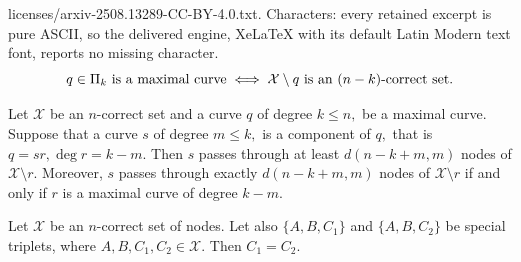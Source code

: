 \documentclass[10pt,a4paper]{amsart}
\newcommand{\Xset}{\mathcal{X}}
\begin{document}
licenses/arxiv-2508.13289-CC-BY-4.0.txt. Characters: every retained excerpt is pure ASCII, so the delivered engine, XeLaTeX with its default Latin Modern text font, reports no missing character.
\begin{equation}\label{maxmax}q\in\Pi_k \hbox{ is a maximal curve}  \iff \Xset\setminus q  \hbox{ is an $(n-k)$-correct set.}\end{equation} 

\begin{proposition}\label{maxcomp} Let $\Xset$ be an $n$-correct set  and
a curve $q$ of degree $k\le n,$ be a maximal curve. Suppose that a curve $s$ of degree $m\le k,$ is a component of $q,$ that is $q=s r, \deg r=k-m.$
Then $s$ passes through  at least $d(n-k+m,m)$ nodes of $\Xset \setminus r.$ Moreover, $s$ passes through  exactly $d(n-k+m,m)$ nodes of $\Xset \setminus r$ if and only if $r$ is a maximal curve of degree $k-m.$ 
\end{proposition}

\begin{proposition} \label{sptr2} Let $\Xset$ be an $n$-correct set of nodes. Let also $\{A,B,C_1\}$ and $\{A,B,C_2\}$ be special triplets, where $A,B,C_1,C_2 \in\Xset$. Then $C_1=C_2.$
\end{proposition}
\end{document}
